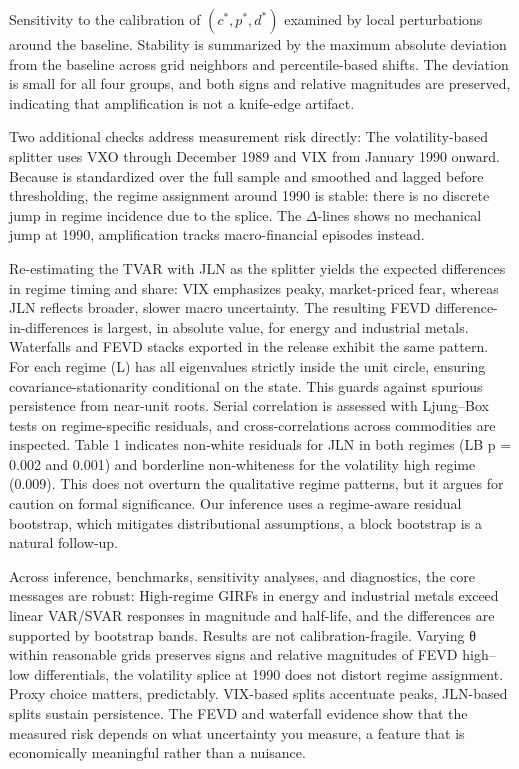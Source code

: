 \documentclass[
  11pt,
]{article}
\begin{document}
Sensitivity to the calibration of \((c^*, p^*, d^*)\) examined by local perturbations around the baseline. Stability is summarized by the maximum absolute deviation from the baseline across grid neighbors and percentile-based shifts. The deviation is small for all four groups, and both signs and relative magnitudes are preserved, indicating that amplification is not a knife-edge artifact.

Two additional checks address measurement risk directly: The volatility-based splitter uses VXO through December 1989 and VIX from January 1990 onward. Because is standardized over the full sample and smoothed and lagged before thresholding, the regime assignment around 1990 is stable: there is no discrete jump in regime incidence due to the splice. The \(\Delta\)-lines shows no mechanical jump at 1990, amplification tracks macro-financial episodes instead.

Re-estimating the TVAR with JLN as the splitter yields the expected differences in regime timing and share: VIX emphasizes peaky, market-priced fear, whereas JLN reflects broader, slower macro uncertainty. The resulting FEVD difference-in-differences is largest, in absolute value, for energy and industrial metals. Waterfalls and FEVD stacks exported in the release exhibit the same pattern. For each regime (L) has all eigenvalues strictly inside the unit circle, ensuring covariance-stationarity conditional on the state. This guards against spurious persistence from near-unit roots. Serial correlation is assessed with Ljung--Box tests on regime-specific residuals, and cross-correlations across commodities are inspected. Table 1 indicates non‑white residuals for JLN in both regimes (LB p = 0.002 and 0.001) and borderline non‑whiteness for the volatility high regime (0.009). This does not overturn the qualitative regime patterns, but it argues for caution on formal significance. Our inference uses a regime‑aware residual bootstrap, which mitigates distributional assumptions, a block bootstrap is a natural follow‑up.

Across inference, benchmarks, sensitivity analyses, and diagnostics, the core messages are robust: High-regime GIRFs in energy and industrial metals exceed linear VAR/SVAR responses in magnitude and half-life, and the differences are supported by bootstrap bands. Results are not calibration-fragile. Varying θ within reasonable grids preserves signs and relative magnitudes of FEVD high--low differentials, the volatility splice at 1990 does not distort regime assignment. Proxy choice matters, predictably. VIX-based splits accentuate peaks, JLN-based splits sustain persistence. The FEVD and waterfall evidence show that the measured risk depends on what uncertainty you measure, a feature that is economically meaningful rather than a nuisance.
\end{document}

